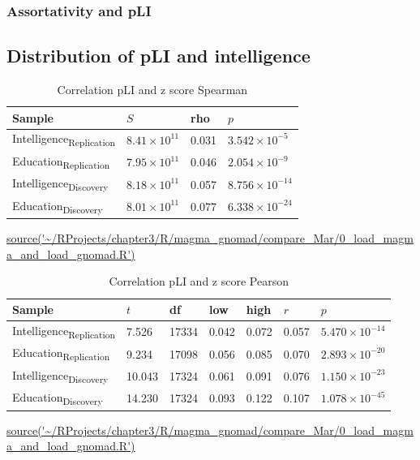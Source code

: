 \subsubsection{Assortativity and pLI}

\subsection{Distribution of pLI and intelligence}



\begin{table}[ht]
\centering
\setlength{\extrarowheight}{2pt}
\begin{tabular}{llll}
  \toprule
Sample & $S$ & rho & $p$ \\ 
  \midrule
Intelligence\textsubscript{Replication} & $8.41 \times 10^{11}$ & 0.031 & $3.542 \times 10^{-5}$ \\ 
  Education\textsubscript{Replication} & $7.95 \times 10^{11}$ & 0.046 & $2.054 \times 10^{-9}$ \\ 
  Intelligence\textsubscript{Discovery} & $8.18 \times 10^{11}$ & 0.057 & $8.756 \times 10^{-14}$ \\ 
  Education\textsubscript{Discovery} & $8.01 \times 10^{11}$ & 0.077 & $6.338 \times 10^{-24}$ \\ 
   \bottomrule
\end{tabular}
\caption{Correlation pLI and z score Spearman } 
\tiny\url{source('~/RProjects/chapter3/R/magma_gnomad/compare_Mar/0_load_magma_and_load_gnomad.R')}
\label{tab: Correlation pLI and z score Spearman}
\end{table}


\begin{table}[ht]
\centering
\setlength{\extrarowheight}{2pt}
\begin{tabular}{lllllll}
  \toprule
Sample & $t$ & df & low & high & $r$ & $p$ \\ 
  \midrule
Intelligence\textsubscript{Replication} & 7.526 & 17334 & 0.042 & 0.072 & 0.057 & $5.470 \times 10^{-14}$ \\ 
  Education\textsubscript{Replication} & 9.234 & 17098 & 0.056 & 0.085 & 0.070 & $2.893 \times 10^{-20}$ \\ 
  Intelligence\textsubscript{Discovery} & 10.043 & 17324 & 0.061 & 0.091 & 0.076 & $1.150 \times 10^{-23}$ \\ 
  Education\textsubscript{Discovery} & 14.230 & 17324 & 0.093 & 0.122 & 0.107 & $1.078 \times 10^{-45}$ \\ 
   \bottomrule
\end{tabular}
\caption{Correlation pLI and z score Pearson } 
\tiny\url{source('~/RProjects/chapter3/R/magma_gnomad/compare_Mar/0_load_magma_and_load_gnomad.R')}
\label{tab: Correlation pLI and z score Pearson}
\end{table}



